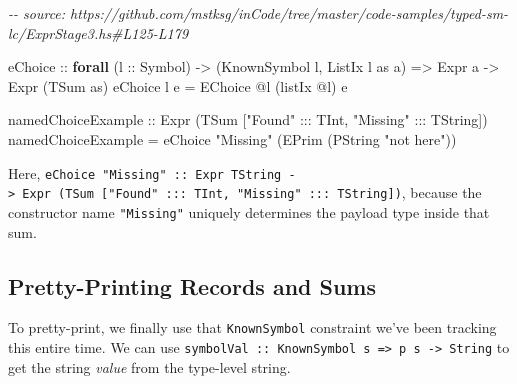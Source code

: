 \documentclass[]{article}
\newenvironment{Shaded}{}{}
\newcommand{\CommentTok}[1]{\textcolor[rgb]{0.38,0.63,0.69}{\textit{#1}}}
\newcommand{\DataTypeTok}[1]{\textcolor[rgb]{0.56,0.13,0.00}{#1}}
\newcommand{\KeywordTok}[1]{\textcolor[rgb]{0.00,0.44,0.13}{\textbf{#1}}}
\newcommand{\NormalTok}[1]{#1}
\newcommand{\OperatorTok}[1]{\textcolor[rgb]{0.40,0.40,0.40}{#1}}
\newcommand{\OtherTok}[1]{\textcolor[rgb]{0.00,0.44,0.13}{#1}}
\newcommand{\StringTok}[1]{\textcolor[rgb]{0.25,0.44,0.63}{#1}}
\begin{document}
\begin{Shaded}
\begin{Highlighting}[]
\CommentTok{{-}{-} source: https://github.com/mstksg/inCode/tree/master/code{-}samples/typed{-}sm{-}lc/ExprStage3.hs\#L125{-}L179}

\OtherTok{eChoice ::}
  \KeywordTok{forall}\NormalTok{ (}\OtherTok{l ::} \DataTypeTok{Symbol}\NormalTok{) }\OtherTok{{-}\textgreater{}}
\NormalTok{  (}\DataTypeTok{KnownSymbol}\NormalTok{ l, }\DataTypeTok{ListIx}\NormalTok{ l as a) }\OtherTok{=\textgreater{}}
  \DataTypeTok{Expr}\NormalTok{ a }\OtherTok{{-}\textgreater{}}
  \DataTypeTok{Expr}\NormalTok{ (}\DataTypeTok{TSum}\NormalTok{ as)}
\NormalTok{eChoice l e }\OtherTok{=} \DataTypeTok{EChoice} \OperatorTok{@}\NormalTok{l (listIx }\OperatorTok{@}\NormalTok{l) e}

\OtherTok{namedChoiceExample ::} \DataTypeTok{Expr}\NormalTok{ (}\DataTypeTok{TSum}\NormalTok{ [}\StringTok{"Found"} \OperatorTok{:::} \DataTypeTok{TInt}\NormalTok{, }\StringTok{"Missing"} \OperatorTok{:::} \DataTypeTok{TString}\NormalTok{])}
\NormalTok{namedChoiceExample }\OtherTok{=}\NormalTok{ eChoice }\StringTok{"Missing"}\NormalTok{ (}\DataTypeTok{EPrim}\NormalTok{ (}\DataTypeTok{PString} \StringTok{"not here"}\NormalTok{))}
\end{Highlighting}
\end{Shaded}

Here,
\texttt{eChoice\ "Missing"\ ::\ Expr\ TString\ -\textgreater{}\ Expr\ (TSum\ {[}"Found"\ :::\ TInt,\ "Missing"\ :::\ TString{]})},
because the constructor name \texttt{"Missing"} uniquely determines the payload
type inside that sum.

\subsection{Pretty-Printing Records and
Sums}\label{pretty-printing-records-and-sums}

To pretty-print, we finally use that \texttt{KnownSymbol} constraint we've been
tracking this entire time. We can use
\texttt{symbolVal\ ::\ KnownSymbol\ s\ =\textgreater{}\ p\ s\ -\textgreater{}\ String}
to get the string \emph{value} from the type-level string.
\end{document}
